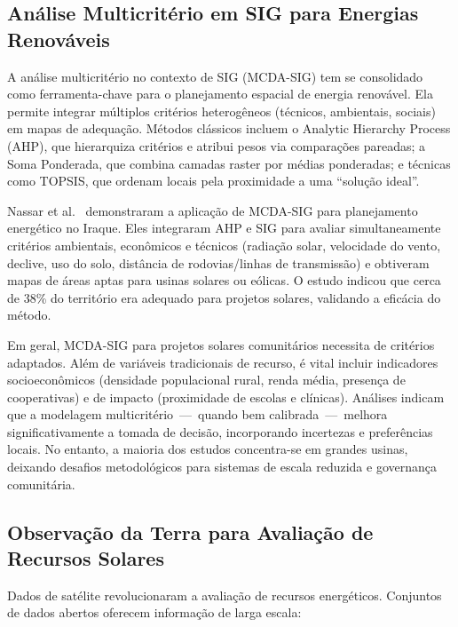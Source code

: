 \documentclass[12pt, a4paper]{article}
\begin{document}
\subsection{Análise Multicritério em SIG para Energias Renováveis}

A análise multicritério no contexto de SIG (MCDA-SIG) tem se consolidado como ferramenta-chave para o planejamento espacial de energia renovável. Ela permite integrar múltiplos critérios heterogêneos (técnicos, ambientais, sociais) em mapas de adequação. Métodos clássicos incluem o Analytic Hierarchy Process (AHP), que hierarquiza critérios e atribui pesos via comparações pareadas; a Soma Ponderada, que combina camadas raster por médias ponderadas; e técnicas como TOPSIS, que ordenam locais pela proximidade a uma ``solução ideal''.

Nassar et al.~\citep{Nassar2025} demonstraram a aplicação de MCDA-SIG para planejamento energético no Iraque. Eles integraram AHP e SIG para avaliar simultaneamente critérios ambientais, econômicos e técnicos (radiação solar, velocidade do vento, declive, uso do solo, distância de rodovias/linhas de transmissão) e obtiveram mapas de áreas aptas para usinas solares ou eólicas. O estudo indicou que cerca de 38\% do território era adequado para projetos solares, validando a eficácia do método.

Em geral, MCDA-SIG para projetos solares comunitários necessita de critérios adaptados. Além de variáveis tradicionais de recurso, é vital incluir indicadores socioeconômicos (densidade populacional rural, renda média, presença de cooperativas) e de impacto (proximidade de escolas e clínicas). Análises indicam que a modelagem multicritério~---~quando bem calibrada~---~melhora significativamente a tomada de decisão, incorporando incertezas e preferências locais. No entanto, a maioria dos estudos concentra-se em grandes usinas, deixando desafios metodológicos para sistemas de escala reduzida e governança comunitária.

\subsection{Observação da Terra para Avaliação de Recursos Solares}

Dados de satélite revolucionaram a avaliação de recursos energéticos. Conjuntos de dados abertos oferecem informação de larga escala:
\end{document}
